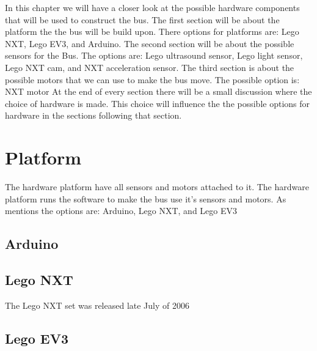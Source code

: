 In this chapter we will have a closer look at the possible hardware components that will be used to construct the bus. The first section will be about the platform the the bus will be build upon. There options for platforms are: Lego NXT, Lego EV3, and Arduino.
The second section will be about the possible sensors for the Bus. The options are: Lego ultrasound sensor, Lego light sensor, Lego NXT cam, and NXT acceleration sensor.
The third section is about the possible motors that we can use to make the bus move. The possible option is: NXT motor
At the end of every section there will be a small discussion where the choice of hardware is made. This choice will influence the the possible options for hardware in the sections following that section.

\section{Platform}

The hardware platform have all sensors and motors attached to it. The hardware platform runs the software to make the bus use it's sensors and motors. As mentions the options are: Arduino, Lego NXT, and Lego EV3 

\subsection{Arduino}



\subsection{Lego NXT}

The Lego NXT set was released late July of 2006

\subsection{Lego EV3}

